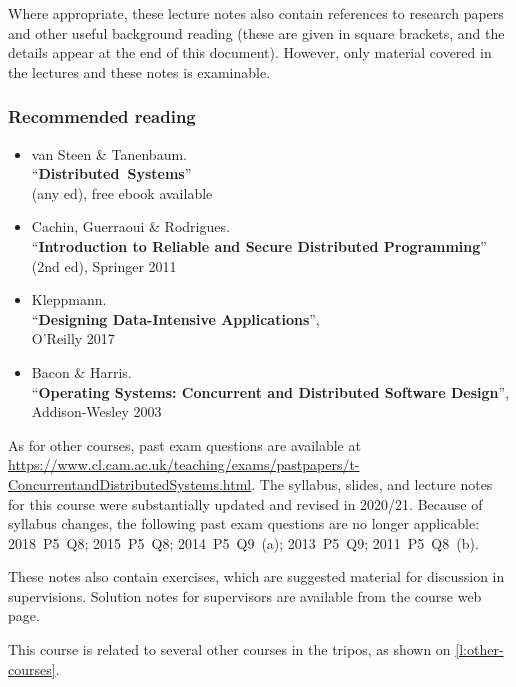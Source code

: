 Where appropriate, these lecture notes also contain references to research papers and other useful background reading (these are given in square brackets, and the details appear at the end of this document).
However, only material covered in the lectures and these notes is examinable.

\begin{frame}
    \label{s:reading}
    \frametitle{Recommended reading}
    \begin{itemize}
        \item van Steen \& Tanenbaum.\\ ``\textbf{Distributed Systems}''\\(any ed), free ebook available
        \item Cachin, Guerraoui \& Rodrigues. \\ ``\textbf{Introduction to Reliable and Secure Distributed Programming}'' (2nd ed), Springer 2011
        \item Kleppmann.\\ ``\textbf{Designing Data-Intensive Applications}'',\\O’Reilly 2017
        \item Bacon \& Harris.\\ ``\textbf{Operating Systems: Concurrent and Distributed Software Design}'', Addison-Wesley 2003
    \end{itemize}
\end{frame}

As for other courses, past exam questions are available at \url{https://www.cl.cam.ac.uk/teaching/exams/pastpapers/t-ConcurrentandDistributedSystems.html}.
The syllabus, slides, and lecture notes for this course were substantially updated and revised in 2020/21.
Because of syllabus changes, the following past exam questions are no longer applicable: 2018~P5~Q8; 2015~P5~Q8; 2014~P5~Q9~(a); 2013~P5~Q9; 2011~P5~Q8~(b).

These notes also contain exercises, which are suggested material for discussion in supervisions.
Solution notes for supervisors are available from the course web page.

This course is related to several other courses in the tripos, as shown on \autoref{l:other-courses}.

